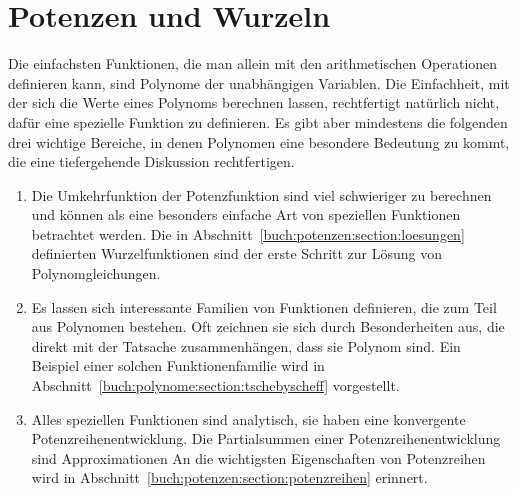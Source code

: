 %
%
%
\chapter{Potenzen und Wurzeln
\label{buch:chapter:potenzen}}
\rhead{}
Die einfachsten Funktionen, die man allein mit den arithmetischen
Operationen definieren kann, sind Polynome der unabhängigen Variablen.
Die Einfachheit, mit der sich die Werte eines Polynoms berechnen lassen,
rechtfertigt natürlich nicht, dafür eine spezielle Funktion zu definieren.
Es gibt aber mindestens die folgenden drei wichtige Bereiche, in denen
Polynomen eine besondere Bedeutung zu kommt, die eine tiefergehende
Diskussion rechtfertigen.
\begin{enumerate}
\item
Die Umkehrfunktion der Potenzfunktion sind viel schwieriger zu 
berechnen und können als eine besonders einfache Art von speziellen
Funktionen betrachtet werden.
Die in Abschnitt~\ref{buch:potenzen:section:loesungen} definierten
Wurzelfunktionen sind der erste Schritt zur Lösung von Polynomgleichungen.
\item
Es lassen sich interessante Familien von Funktionen
definieren, die zum Teil aus Polynomen bestehen.
Oft zeichnen sie sich durch Besonderheiten aus, die
direkt mit der Tatsache zusammenhängen, dass sie Polynom sind.
Ein Beispiel einer solchen Funktionenfamilie wird in
Abschnitt~\ref{buch:polynome:section:tschebyscheff} vorgestellt.
\item
Alles speziellen Funktionen sind analytisch, sie haben eine konvergente
Potenzreihenentwicklung.
Die Partialsummen einer Potenzreihenentwicklung sind Approximationen
An die wichtigsten Eigenschaften von Potenzreihen wird in 
Abschnitt~\ref{buch:potenzen:section:potenzreihen} erinnert.
\end{enumerate}







